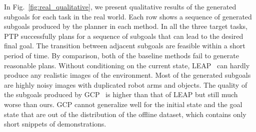 In Fig.~\ref{fig:real_qualitative}, we present qualitative results of the generated subgoals for each task in the real world. Each row shows a sequence of generated subgoals produced by the planner in each method. In all the three target tasks, PTP successfully plans for a sequence of subgoals that can lead to the desired final goal. The transition between adjacent subgoals are feasible within a short period of time. By comparison, both of the baseline methods fail to generate reasonable plans. Without conditioning on the current state, LEAP~\citep{Nasiriany2019PlanningWG} can hardly produce any realistic images of the environment. Most of the generated subgoals are highly noisy images with duplicated robot arms and objects. The quality of the subgoals produced by GCP~\citep{Pertsch2020LongHorizonVP} is higher than that of LEAP but still much worse than ours. GCP cannot generalize well for the initial state and the goal state that are out of the distribution of the offline dataset, which contains only short snippets of demonstrations.
